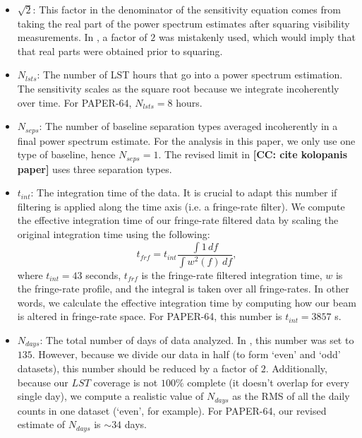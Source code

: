 \documentclass[preprint2,numberedappendix,tighten]{aastex6}  %
\newcommand{\cc}[1]{{\color{purple} \textbf{[CC: #1]}}}
\begin{document}
\begin{itemize}
where $\nu$ are frequencies in GHz. We use a receiver temperature of $200$ K, yielding $T_{sys} = 487$ at $150$ MHz. This is lower than in \citet{ali_et_al2015} because \cc{why?}.
\item $\sqrt{2}$: This factor in the denominator of the sensitivity equation comes from taking the real part of the power spectrum estimates after squaring visibility measurements. In \citet{ali_et_al2015}, a factor of $2$ was mistakenly used, which would imply that that real parts were obtained prior to squaring.
\item $N_{lsts}$: The number of LST hours that go into a power spectrum estimation. The sensitivity scales as the square root because we integrate incoherently over time. For PAPER-64, $N_{lsts} = 8$ hours.
\item $N_{seps}$: The number of baseline separation types averaged incoherently in a final power spectrum estimate. For the analysis in this paper, we only use one type of baseline, hence $N_{seps}=1$. The revised limit in \cc{cite kolopanis paper} uses three separation types.
\item $t_{int}$: The integration time of the data. It is crucial to adapt this number if filtering is applied along the time axis (i.e. a fringe-rate filter). We compute the effective integration time of our fringe-rate filtered data by scaling the original integration time using the following:
\begin{equation}
t_{frf} = t_{int} \frac{\int1 \, df}{\int w^{2}(f) \,df},
\end{equation}
where $t_{int}=43$ seconds, $t_{frf}$ is the fringe-rate filtered integration time, $w$ is the fringe-rate profile, and the integral is taken over all fringe-rates. In other words, we calculate the effective integration time by computing how our beam is altered in fringe-rate space. For PAPER-64, this number is $t_{int} = 3857$ s. 
\item $N_{days}$: The total number of days of data analyzed. In \citet{ali_et_al2015}, this number was set to $135$. However, because we divide our data in half (to form `even' and `odd' datasets), this number should be reduced by a factor of $2$. Additionally, because our $LST$ coverage is not $100\%$ complete (it doesn't overlap for every single day), we compute a realistic value of $N_{days}$ as the RMS of all the daily counts in one dataset (`even', for example). For PAPER-64, our revised estimate of $N_{days}$ is $\sim34$ days.

\end{itemize}
\end{document}

